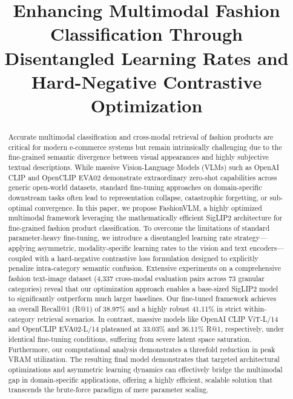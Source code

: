 \documentclass[conference]{IEEEtran}
\begin{document}
\title{Enhancing Multimodal Fashion Classification Through Disentangled Learning Rates and Hard-Negative Contrastive Optimization}

\author{
\and
{}
}

\maketitle

\begin{abstract}
Accurate multimodal classification and cross-modal retrieval of fashion products are critical for modern e-commerce systems but remain intrinsically challenging due to the fine-grained semantic divergence between visual appearances and highly subjective textual descriptions. While massive Vision-Language Models (VLMs) such as OpenAI CLIP and OpenCLIP EVA02 demonstrate extraordinary zero-shot capabilities across generic open-world datasets, standard fine-tuning approaches on domain-specific downstream tasks often lead to representation collapse, catastrophic forgetting, or sub-optimal convergence. In this paper, we propose FashionVLM, a highly optimized multimodal framework leveraging the mathematically efficient SigLIP2 architecture for fine-grained fashion product classification. To overcome the limitations of standard parameter-heavy fine-tuning, we introduce a disentangled learning rate strategy---applying asymmetric, modality-specific learning rates to the vision and text encoders---coupled with a hard-negative contrastive loss formulation designed to explicitly penalize intra-category semantic confusion. Extensive experiments on a comprehensive fashion text-image dataset (4,337 cross-modal evaluation pairs across 73 granular categories) reveal that our optimization approach enables a base-sized SigLIP2 model to significantly outperform much larger baselines. Our fine-tuned framework achieves an overall Recall@1 (R@1) of 38.97\% and a highly robust 41.11\% in strict within-category retrieval scenarios. In contrast, massive models like OpenAI CLIP ViT-L/14 and OpenCLIP EVA02-L/14 plateaued at 33.03\% and 36.11\% R@1, respectively, under identical fine-tuning conditions, suffering from severe latent space saturation. Furthermore, our computational analysis demonstrates a threefold reduction in peak VRAM utilization. The resulting final model demonstrates that targeted architectural optimizations and asymmetric learning dynamics can effectively bridge the multimodal gap in domain-specific applications, offering a highly efficient, scalable solution that transcends the brute-force paradigm of mere parameter scaling.
\end{abstract}
\end{document}
